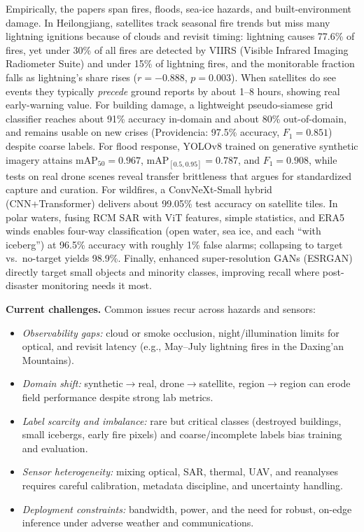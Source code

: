 \documentclass[conference,a4paper]{IEEEtran}
\begin{document}
Empirically, the papers span fires, floods, sea-ice hazards, and built-environment damage. In Heilongjiang, satellites track seasonal fire trends but miss many lightning ignitions because of clouds and revisit timing: lightning causes 77.6\% of fires, yet under 30\% of all fires are detected by VIIRS (Visible Infrared Imaging Radiometer Suite) and under 15\% of lightning fires, and the monitorable fraction falls as lightning’s share rises ($r=-0.888$, $p=0.003$). When satellites do see events they typically \emph{precede} ground reports by about 1--8 hours, showing real early-warning value. For building damage, a lightweight pseudo-siamese grid classifier reaches about 91\% accuracy in-domain and about 80\% out-of-domain, and remains usable on new crises (Providencia: 97.5\% accuracy, $F_1=0.851$) despite coarse labels. For flood response, YOLOv8 trained on generative synthetic imagery attains $\text{mAP}_{50}=0.967$, $\text{mAP}_{[0.5,0.95]}=0.787$, and $F_1=0.908$, while tests on real drone scenes reveal transfer brittleness that argues for standardized capture and curation. For wildfires, a ConvNeXt-Small hybrid (CNN+Transformer) delivers about 99.05\% test accuracy on satellite tiles. In polar waters, fusing RCM SAR with ViT features, simple statistics, and ERA5 winds enables four-way classification (open water, sea ice, and each “with iceberg”) at 96.5\% accuracy with roughly 1\% false alarms; collapsing to target vs.\ no-target yields 98.9\%. Finally, enhanced super-resolution GANs (ESRGAN) directly target small objects and minority classes, improving recall where post-disaster monitoring needs it most.

\textbf{Current challenges.} Common issues recur across hazards and sensors:
\begin{itemize}
  \item \textit{Observability gaps:} cloud or smoke occlusion, night/illumination limits for optical, and revisit latency (e.g., May--July lightning fires in the Daxing’an Mountains).
  \item \textit{Domain shift:} synthetic$\rightarrow$real, drone$\rightarrow$satellite, region$\rightarrow$region can erode field performance despite strong lab metrics.
  \item \textit{Label scarcity and imbalance:} rare but critical classes (destroyed buildings, small icebergs, early fire pixels) and coarse/incomplete labels bias training and evaluation.
  \item \textit{Sensor heterogeneity:} mixing optical, SAR, thermal, UAV, and reanalyses requires careful calibration, metadata discipline, and uncertainty handling.
  \item \textit{Deployment constraints:} bandwidth, power, and the need for robust, on-edge inference under adverse weather and communications.
\end{itemize}
\end{document}
